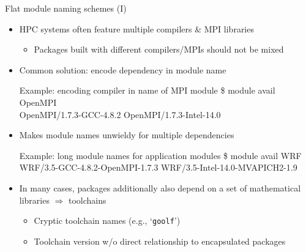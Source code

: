 \documentclass[10pt,xcolor={usenames,dvipsnames}]{beamer}
\begin{document}

\begin{frame}{Flat module naming schemes (I)}
\begin{itemize}
    \item
        HPC systems often feature multiple compilers \& MPI libraries
        \begin{itemize}
            \item
                Packages built with different compilers/MPIs should not
                be mixed
        \end{itemize}
    \item
        Common solution: encode dependency in module name\\
        \enskip
        \begin{minipage}{0.9\textwidth}
            \begin{exampleblock}{\footnotesize Example: encoding compiler in name of MPI module}
                \scriptsize
                \ttfamily
                \$ module avail OpenMPI\\
                OpenMPI/1.7.3-GCC-4.8.2
                    \quad OpenMPI/1.7.3-Intel-14.0
            \end{exampleblock}
        \end{minipage}
    \smallskip
    \item
        Makes module names unwieldy for multiple dependencies\\
        \enskip
        \begin{minipage}{0.9\textwidth}
            \begin{exampleblock}{\footnotesize Example: long module names for application modules}
                \scriptsize
                \ttfamily
                \$ module avail WRF\\
                WRF/3.5-GCC-4.8.2-OpenMPI-1.7.3
                    \quad WRF/3.5-Intel-14.0-MVAPICH2-1.9
            \end{exampleblock}
        \end{minipage}
    \smallskip
    \item
        In many cases, packages additionally also depend on a set of
        mathematical libraries $\Rightarrow$ toolchains
        \begin{itemize}
            \item
                Cryptic toolchain names (e.g., `\texttt{goolf}')
            \item
                Toolchain version w/o direct relationship to encapsulated packages
        \end{itemize}
\end{itemize}
\end{frame}
\end{document}
